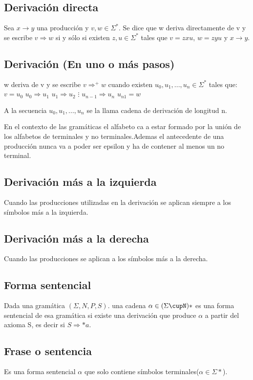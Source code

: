 \subsection{Derivación directa}
Sea $x\rightarrow y$ una producción y $v,w\in\Sigma^{*}$. Se dice que w deriva directamente de v y se escribe $v\Rightarrow w$ si y sólo si existen $z,u\in\Sigma^{*}$ tales que $v=zxu$, $w=zyu$ y $x\rightarrow y$. 
\subsection{Derivación (En uno o más pasos)}

w deriva de v y se escribe $v\Rightarrow^{+}w$ cuando existen $u_{0},u_{1},...,u_{n}\in\Sigma^{*}$ tales que:
$v=u_{0}$
$u_{0}\Rightarrow u_{1}$
$u_{1}\Rightarrow u_{2}$
$\vdots$
$u_{n-1}\Rightarrow u_{n}$
$u_{n1}=w$

A la secuencia $u_{0},u_{1},...,u_{n}$ se la llama cadena de derivación de longitud n.


En el contexto de las gramáticas el alfabeto ca a estar formado por la unión de los alfabetos de terminales y no terminales.Ademas el antecedente de una producción nunca va a poder ser epsilon y ha de contener al menos un no terminal. 

\subsection{Derivación más a la izquierda}
Cuando las producciones utilizadas en la derivación se aplican siempre a los símbolos más a la izquierda.

\subsection{Derivación más a la derecha}
Cuando las producciones se aplican a los símbolos más a la derecha.
\subsection{Forma sentencial}
Dada una gramática $(\Sigma,N,P,S)$. una cadena $\alpha\in(\Sigma\cupN)*$ es una forma sentencial de esa gramática si existe una derivación que produce $\alpha$ a partir del axioma S, es decir si $S\Rightarrow*a$.
\subsection{Frase o sentencia}
Es una forma sentencial $\alpha$ que solo contiene símbolos terminales($\alpha\in\Sigma* $).
